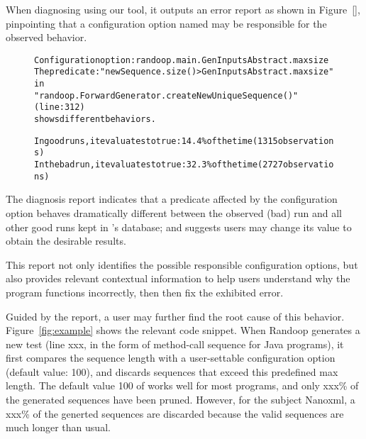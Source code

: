 When diagnosing using our \ourtool tool, it outputs an error report as
shown in Figure~\ref{}, pinpointing that a configuration option named
 may be responsible for the observed behavior.

\begin{figure}[t]
\begin{CodeOut}
\begin{alltt} 
Configuration option: randoop.main.GenInputsAbstract.maxsize
The predicate: "newSequence.size() > GenInputsAbstract.maxsize" in
"randoop.ForwardGenerator.createNewUniqueSequence()" (line: 312)
shows different behaviors.

In good runs, it evaluates to true:  14.4\% of the time (1315 observations)
In the bad run, it evaluates to true: 32.3\% of the time (2727 observations)

\end{alltt}
\end{CodeOut}
\vspace*{-15pt}
\end{figure}


The diagnosis report indicates that a predicate affected by
the configuration option  behaves dramatically
different between the observed (bad) run and all other good runs
kept in \ourtool's database; and suggests users may change its
value to obtain the desirable results.

This report not only identifies the possible responsible configuration
options, but also provides relevant contextual information to
help users understand why the program functions incorrectly,
then then fix the exhibited error.

Guided by the report, a user may further find the root
cause of this behavior. Figure~\ref{fig:example} shows
the relevant code snippet. When Randoop generates a new
test (line xxx, in the form of method-call sequence for Java programs),
it first compares the sequence length with a user-settable
configuration option  (default value: 100), and
discards sequences that exceed this predefined max length.
The default value 100 of  works well for most
programs, and only xxx\% of the generated sequences have been pruned.
However, for the subject Nanoxml, a xxx\% of the generted sequences
are discarded because the valid sequences are much longer than usual.

